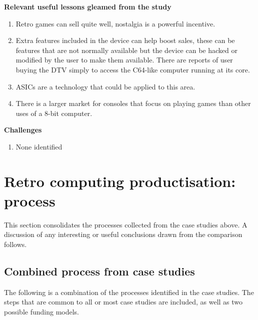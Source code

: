 \textbf{Relevant useful lessons gleamed from the study}\\
\begin{enumerate}
\item Retro games can sell quite well, nostalgia is a powerful incentive.
\item Extra features included in the device can help boost sales, these can be features that are not normally available but the device can be hacked or modified by the user to make them available. There are reports of user buying the DTV simply to access the C64-like computer running at its core.
\item ASICs are a technology that could be applied to this area.
\item There is a larger market for consoles that focus on playing games than other uses of a 8-bit computer.
\end{enumerate}

\textbf{Challenges}
\begin{enumerate}
\item None identified
\end{enumerate}

\section{Retro computing productisation: process}
This section consolidates the processes collected from the case studies above. A discussion of any interesting or useful conclusions drawn from the comparison follows.\\

\subsection{Combined process from case studies}
The following is a combination of the processes identified in the case studies. The steps that are common to all or most case studies are included, as well as two possible funding models.\\

